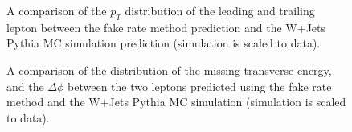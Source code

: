 \begin{figure}[!htbp]
\begin{center}
\caption{A comparison of the $p_{T}$ distribution of the leading and trailing lepton
between the fake rate method prediction and the W+Jets Pythia MC simulation prediction 
(simulation is scaled to data). }
\label{fig:FakeBkgDataDistribution_LeptonPt}
\end{center}
\end{figure}

\begin{figure}[!htbp]
\begin{center}
\caption{A comparison of the distribution of the missing transverse energy, 
and the $\Delta\phi$ between the two leptons predicted using the fake rate method and the
W+Jets Pythia MC simulation (simulation is scaled to data).}
\label{fig:FakeBkgDataDistribution_MetAndDeltaPhi}
\end{center}
\end{figure}

